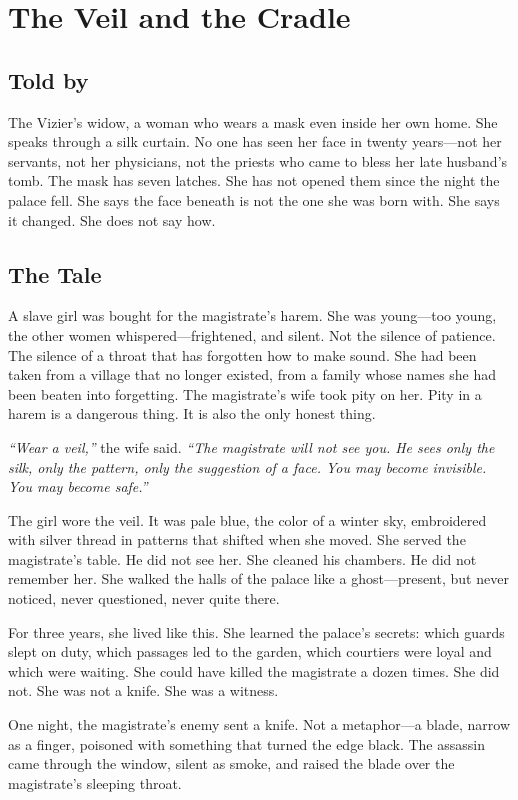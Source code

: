 \chapter{The Veil and the Cradle}

\section*{Told by}
The Vizier's widow, a woman who wears a mask even inside her own home. She speaks through a silk curtain. No one has seen her face in twenty years—not her servants, not her physicians, not the priests who came to bless her late husband's tomb. The mask has seven latches. She has not opened them since the night the palace fell. She says the face beneath is not the one she was born with. She says it changed. She does not say how.

\section*{The Tale}

A slave girl was bought for the magistrate's harem. She was young—too young, the other women whispered—frightened, and silent. Not the silence of patience. The silence of a throat that has forgotten how to make sound. She had been taken from a village that no longer existed, from a family whose names she had been beaten into forgetting. The magistrate's wife took pity on her. Pity in a harem is a dangerous thing. It is also the only honest thing.

\textit{``Wear a veil,''} the wife said. \textit{``The magistrate will not see you. He sees only the silk, only the pattern, only the suggestion of a face. You may become invisible. You may become safe.''}

The girl wore the veil. It was pale blue, the color of a winter sky, embroidered with silver thread in patterns that shifted when she moved. She served the magistrate's table. He did not see her. She cleaned his chambers. He did not remember her. She walked the halls of the palace like a ghost—present, but never noticed, never questioned, never quite there.

For three years, she lived like this. She learned the palace's secrets: which guards slept on duty, which passages led to the garden, which courtiers were loyal and which were waiting. She could have killed the magistrate a dozen times. She did not. She was not a knife. She was a witness.

One night, the magistrate's enemy sent a knife. Not a metaphor—a blade, narrow as a finger, poisoned with something that turned the edge black. The assassin came through the window, silent as smoke, and raised the blade over the magistrate's sleeping throat.

